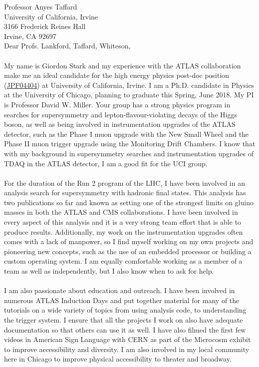 \documentclass[11pt,letter]{article}
\begin{document}
\thispagestyle{fancy}

Professor Anyes Taffard \\
University of California, Irvine \\
3166 Frederick Reines Hall \\
Irvine, CA 92697 \\[0.5cm]

Dear Profs. Lankford, Taffard, Whiteson, \\
\\
My name is Giordon Stark and my experience with the ATLAS collaboration make me an ideal candidate for the high energy physics post-doc position (\href{https://recruit.ap.uci.edu/apply/JPF04404}{JPF04404}) at University of California, Irvine. I am a Ph.D. candidate in Physics at the University of Chicago, planning to graduate this Spring, June 2018. My PI is Professor David W. Miller. Your group has a strong physics program in searches for supersymmetry and lepton-flavour-violating decays of the Higgs boson, as well as being involved in instrumentation upgrades of the ATLAS detector, such as the Phase I muon upgrade with the New Small Wheel and the Phase II muon trigger upgrade using the Monitoring Drift Chambers. I know that with my background in supersymmetry searches and instrumentation upgrades of TDAQ in the ATLAS detector, I am a good fit for the UCI group.\\
\\
For the duration of the Run 2 program of the LHC, I have been involved in an analysis search for supersymmetry with hadronic final states. This analysis has two publications so far and known as setting one of the strongest limits on gluino masses in both the ATLAS and CMS collaborations. I have been involved in every aspect of this analysis and it is a very strong team effort that is able to produce results. Additionally, my work on the instrumentation upgrades often comes with a lack of manpower, so I find myself working on my own projects and pioneering new concepts, such as the use of an embedded processor or building a custom operating system. I am equally comfortable working as a member of a team as well as independently, but I also know when to ask for help.\\
\\
I am also passionate about education and outreach. I have been involved in numerous ATLAS Induction Days and put together material for many of the tutorials on a wide variety of topics from using analysis code, to understanding the trigger system. I ensure that all the projects I work on also have adequate documentation so that others can use it as well. I have also filmed the first few videos in American Sign Language with CERN as part of the Microcosm exhibit to improve accessibility and diversity. I am also involved in my local community here in Chicago to improve physical accessibility to theater and broadway. \\
\end{document}

